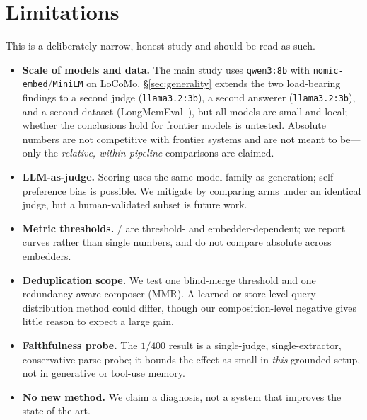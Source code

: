 \section{Limitations}
\label{sec:limitations}

This is a deliberately narrow, honest study and should be read as such.
\begin{itemize}
  \item \textbf{Scale of models and data.} The main study uses \texttt{qwen3:8b}
  with \texttt{nomic-embed}/\texttt{MiniLM} on LoCoMo. \S\ref{sec:generality}
  extends the two load-bearing findings to a second judge (\texttt{llama3.2:3b}),
  a second answerer (\texttt{llama3.2:3b}), and a second dataset
  (LongMemEval~\cite{wu2024longmemeval}), but all models are small and local;
  whether the conclusions hold for frontier models is untested. Absolute numbers
  are not competitive with frontier systems and are not meant to be---only the
  \emph{relative, within-pipeline} comparisons are claimed.
  \item \textbf{LLM-as-judge.} Scoring uses the same model family as generation;
  self-preference bias is possible. We mitigate by comparing arms under an
  identical judge, but a human-validated subset is future work.
  \item \textbf{Metric thresholds.} \mdr/\rtf{} are threshold- and
  embedder-dependent; we report curves rather than single numbers, and do not
  compare absolute \mdr{} across embedders.
  \item \textbf{Deduplication scope.} We test one blind-merge threshold and one
  redundancy-aware composer (MMR). A learned or store-level query-distribution
  method could differ, though our composition-level negative gives little reason
  to expect a large gain.
  \item \textbf{Faithfulness probe.} The $1/400$ result is a single-judge,
  single-extractor, conservative-parse probe; it bounds the effect as small in
  \emph{this} grounded setup, not in generative or tool-use memory.
  \item \textbf{No new method.} We claim a diagnosis, not a system that improves
  the state of the art.
\end{itemize}
